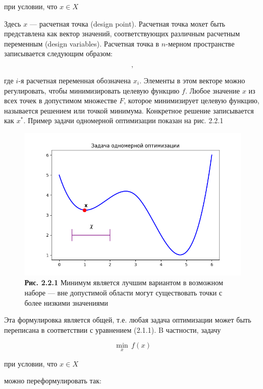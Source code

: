 \begin{center}
при условии, что $x \in X$
\end{center}

Здесь $x$ — расчетная точка (design point). Расчетная точка мохет быть представлена как вектор значений, соответствующих различным расчетным переменным (design variables). Расчетная точка в $n$-мерном пространстве записывается следующим образом:

\begin{equation}
    [x_1,x_2,...,x_n],
\end{equation}

где $i$-я расчетная переменная обозначена $x_i$. Элементы в этом векторе можно регулировать, чтобы минимизировать целевую функцию $f$. Любое значение $x$ из всех точек в допустимом множестве $F$, которое минимизирует целевую функцию, называется решением или точкой минимума. Конкретное решение записывается как $x^*$. Пример задачи одномерной оптимизации показан на рис. 2.2.1

\begin{figure}[ht]
 \centering
		\includegraphics[height =6 cm, keepaspectratio]{images/Figure_1.png}
		\caption{ \textbf{Рис. 2.2.1} Минимум является лучшим вариантом в возможном наборе —
вне допустимой области могут существовать точки с более низкими значениями
}
	\end{figure}

Эта формулировка является общей, т.е. любая задача оптимизации может быть переписана в соответствии с уравнением (2.1.1). B частности, задачу

\begin{equation}
  \min_{x} \, f(x) 
\end{equation}

\begin{center}
при условии, что $x \in X$
\end{center}

можно переформулировать так:

